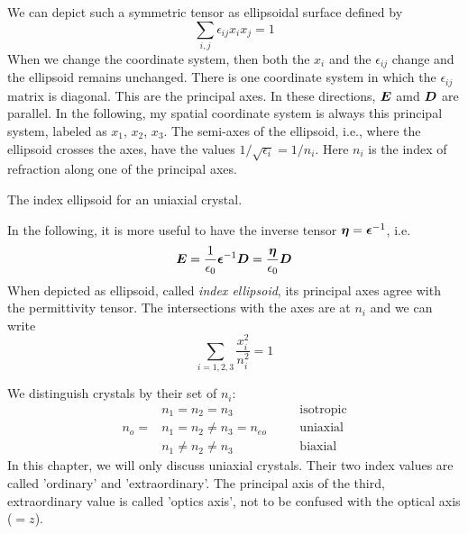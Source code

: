 We can depict such a symmetric tensor as ellipsoidal surface defined by 
\begin{equation}
     \sum_{i,j} \epsilon_{i j}  x_i x_j = 1
\end{equation}
When we change the coordinate system, then both the $x_i$ and the $\epsilon_{ij}$ change and the ellipsoid remains unchanged. There is one coordinate system in which the $\epsilon_{ij}$ matrix is diagonal. This are the principal axes.  In these directions, $\boldsymbol{E}$ amd $\boldsymbol{D}$ are parallel. In the following, my spatial coordinate system is always this principal system, labeled as $x_1$, $x_2$, $x_3$. The semi-axes of the ellipsoid, i.e., where the ellipsoid crosses the axes, have the values $1/\sqrt{\epsilon_i} = 1/n_i$. Here $n_i$ is the index of refraction along one of the principal axes.


\begin{marginfigure}
    \caption{The index ellipsoid for an uniaxial crystal.}
\end{marginfigure}


In the following, it is more useful to have the inverse tensor $\boldsymbol{\eta} = \boldsymbol{\epsilon}^{-1}$, i.e.
\begin{equation}
    \boldsymbol{E} = \frac{1}{\epsilon_0} \boldsymbol{\epsilon}^{-1} \boldsymbol{D}  = \frac{\boldsymbol{\eta}}{\epsilon_0}  \boldsymbol{D}
 \end{equation}
When depicted as ellipsoid, called \emph{index ellipsoid}, its principal axes agree with the permittivity tensor. The intersections with the axes are at $n_i$ and we can write
\begin{equation}
    \sum_{i=1,2,3} \frac{x_i^2}{n_i^2} = 1
\end{equation}



We distinguish crystals by their set of $n_i$:
\begin{align}
          &  n_1 = n_2 = n_3             & & \quad \text{isotropic} \\
 n_{o} = &  n_1 = n_2  \neq n_3  =n_{eo} && \quad \text{uniaxial} \\
           &   n_1 \neq n_2  \neq n_3      & & \quad \text{biaxial} 
\end{align}
In this chapter, we will only discuss  uniaxial crystals. Their two index values are called 'ordinary' and 'extraordinary'. The principal axis of the third, extraordinary value is called 'optics axis', not to be confused with the optical axis ($=z$).



